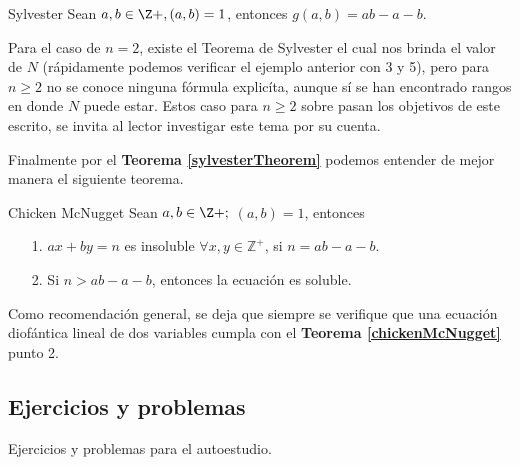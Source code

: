 \begin{theorem.box}{Sylvester}{}\label{sylvesterTheorem}
Sean $a, b\in \Z+, (a,b)=1$, entonces $g(a,b)=ab-a-b.$
\end{theorem.box}

Para el caso de $n=2$, existe el Teorema de Sylvester el cual nos brinda el valor de $N$
(rápidamente podemos verificar el ejemplo anterior con 3 y 5),
pero para $n\geq2$ no se conoce ninguna fórmula explicíta, aunque sí se han encontrado rangos en donde $N$ puede estar.
Estos caso para $n\geq2$ sobre pasan los objetivos de este escrito, se invita al lector investigar este tema por su cuenta.

Finalmente por el \textbf{Teorema \ref{sylvesterTheorem}} podemos entender de mejor manera el siguiente teorema.

\begin{theorem.box}{Chicken McNugget}{}\label{chickenMcNugget}
    Sean $a, b\in \Z+;$ $(a,b)=1$, entonces
    \begin{enumerate}
        \item[1.] $ax+by = n$ es insoluble $\forall x, y \in \mathbb{Z^{+}}$, si $n = ab - a - b.$
        \item[2.] Si $n > ab - a - b$, entonces la ecuación es soluble.
    \end{enumerate}
\end{theorem.box}

Como recomendación general, se deja que siempre se verifique que una ecuación diofántica lineal de dos variables
cumpla con el \textbf{Teorema \ref{chickenMcNugget}} punto 2.




\subsection{Ejercicios y problemas}

Ejercicios y problemas para el autoestudio.
